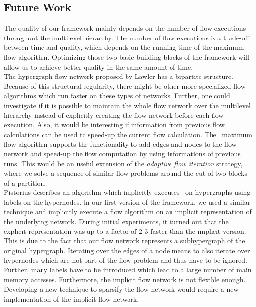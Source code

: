 \subsection{Future Work}

The quality of our framework mainly depends on the number of flow executions
throughout the multilevel hierarchy. The number of flow executions is a trade-off between
time and quality, which depends on the running time of the maximum flow algorithm.
Optimizing those two basic building blocks of the framework will allow us to achieve 
better quality in the same amount of time.\\
The hypergraph flow network proposed by Lawler \cite{lawler1973} has a bipartite 
structure. Because of this structural regularity, there might be other more specialized
flow algorithms which run faster on these types of networks. Further,
one could investigate if it is possible to maintain the whole flow network over the
multilevel hierarchy instead of explicitly creating the flow network before each flow
execution. Also, it would be interesting if information from previous flow calculations can 
be used to speed-up the current flow calculation. The \IBFS~maximum flow algorithm \cite{goldberg2015faster}
supports the functionality to add edges and nodes to the flow network and speed-up
the flow computation by using informations of previous runs. This 
would be an useful extension of the \emph{adaptive flow iteration} strategy, where we solve
a sequence of similar flow problems around the cut of two blocks of a partition. \\
Pistorius \cite{pistorius2003} describes an algorithm which implicitly 
executes \EdmondKarp~on hypergraphs using labels on the hypernodes. 
In our first version of the framework, we used a similar 
technique and implicitly execute a flow algorithm on an implicit representation of 
the underlying network. During initial experiments, it turned out that the explicit representation
was up to a factor of $2$-$3$ faster than the implicit version. 
This is due to the fact that our flow network represents a subhypergraph of the 
original hypergraph. Iterating over the edges of a node means to also iterate 
over hypernodes which are not part of the flow problem and thus have to be ignored.
Further, many labels have to be introduced which lead to a large number of 
main memory accesses. Furthermore, the implicit flow network is not flexible enough. Developing a new 
technique to sparsify the flow network would require a new implementation of 
the implicit flow network.\\
